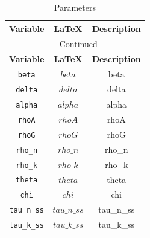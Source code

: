 \begin{center}
\begin{longtable}{ccc}
\caption{Parameters}\\%
\hline%
\multicolumn{1}{c}{\textbf{Variable}} &
\multicolumn{1}{c}{\textbf{\LaTeX}} &
\multicolumn{1}{c}{\textbf{Description}}\\%
\hline\hline%
\endfirsthead
\multicolumn{3}{c}{{\tablename} \thetable{} -- Continued}\\%
\hline%
\multicolumn{1}{c}{\textbf{Variable}} &
\multicolumn{1}{c}{\textbf{\LaTeX}} &
\multicolumn{1}{c}{\textbf{Description}}\\%
\hline\hline%
\endhead
\texttt{beta} & $beta$ & beta\\
\texttt{delta} & $delta$ & delta\\
\texttt{alpha} & $alpha$ & alpha\\
\texttt{rhoA} & $rhoA$ & rhoA\\
\texttt{rhoG} & $rhoG$ & rhoG\\
\texttt{rho\_n} & $rho\_n$ & rho\_n\\
\texttt{rho\_k} & $rho\_k$ & rho\_k\\
\texttt{theta} & $theta$ & theta\\
\texttt{chi} & $chi$ & chi\\
\texttt{tau\_n\_ss} & $tau\_n\_ss$ & tau\_n\_ss\\
\texttt{tau\_k\_ss} & $tau\_k\_ss$ & tau\_k\_ss\\
\hline%
\end{longtable}
\end{center}

